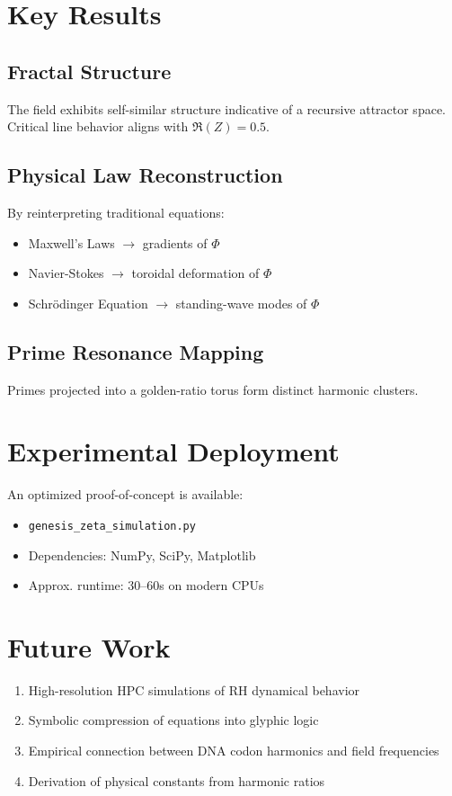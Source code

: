 \documentclass[12pt]{article}
\begin{document}
\section{Key Results}
\subsection{Fractal Structure}
The field exhibits self-similar structure indicative of a recursive attractor space. Critical line behavior aligns with $\Re(Z) = 0.5$.

\subsection{Physical Law Reconstruction}
By reinterpreting traditional equations:
\begin{itemize}
    \item Maxwell's Laws $\rightarrow$ gradients of $\Phi$
    \item Navier-Stokes $\rightarrow$ toroidal deformation of $\Phi$
    \item Schrödinger Equation $\rightarrow$ standing-wave modes of $\Phi$
\end{itemize}

\subsection{Prime Resonance Mapping}
Primes projected into a golden-ratio torus form distinct harmonic clusters.

\section{Experimental Deployment}
An optimized proof-of-concept is available:
\begin{itemize}
    \item \texttt{genesis\_zeta\_simulation.py}
    \item Dependencies: NumPy, SciPy, Matplotlib
    \item Approx. runtime: 30–60s on modern CPUs
\end{itemize}

\section{Future Work}
\begin{enumerate}
    \item High-resolution HPC simulations of RH dynamical behavior
    \item Symbolic compression of equations into glyphic logic
    \item Empirical connection between DNA codon harmonics and field frequencies
    \item Derivation of physical constants from harmonic ratios
\end{enumerate}
\end{document}
